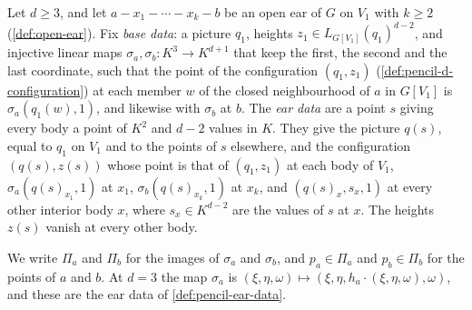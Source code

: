 \begin{definition}
  \label{def:pencil-d-ear-data}
  \leanok
  Let $d \ge 3$, and let $a - x_1 - \cdots - x_k - b$ be an open ear of
  $G$ on $V_1$ with $k \ge 2$ (\cref{def:open-ear}). Fix \emph{base
  data}: a picture $q_1$, heights $z_1 \in L_{G[V_1]}(q_1)^{d-2}$, and
  injective linear maps $\sigma_a, \sigma_b \colon K^3 \to K^{d+1}$ that
  keep the first, the second and the last coordinate, such that the point
  of the configuration $(q_1, z_1)$ (\cref{def:pencil-d-configuration})
  at each member $w$ of the closed neighbourhood of $a$ in $G[V_1]$ is
  $\sigma_a(q_1(w), 1)$, and likewise with $\sigma_b$ at $b$. The
  \emph{ear data} are a point $s$ giving every body a point of $K^2$ and
  $d - 2$ values in $K$. They give the picture $q(s)$, equal to $q_1$ on
  $V_1$ and to the points of $s$ elsewhere, and the configuration
  $(q(s), z(s))$ whose point is that of $(q_1, z_1)$ at each body of
  $V_1$, $\sigma_a(q(s)_{x_1}, 1)$ at $x_1$, $\sigma_b(q(s)_{x_k}, 1)$ at
  $x_k$, and $(q(s)_x, s_x, 1)$ at every other interior body $x$, where
  $s_x \in K^{d-2}$ are the values of $s$ at $x$. The heights $z(s)$
  vanish at every other body.
\end{definition}

We write $\Pi_a$ and $\Pi_b$ for the images of $\sigma_a$ and
$\sigma_b$, and $p_a \in \Pi_a$ and $p_b \in \Pi_b$ for the points of
$a$ and $b$. At $d = 3$ the map $\sigma_a$ is
$(\xi, \eta, \omega) \mapsto (\xi, \eta, h_a \cdot (\xi, \eta, \omega),
\omega)$, and these are the ear data of \cref{def:pencil-ear-data}.

